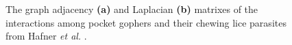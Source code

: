 
\begin{figure}
    \centering
    \caption{The graph adjacency \textbf{(a)} and Laplacian \textbf{(b)} matrixes of the interactions among pocket gophers and their chewing lice parasites from Hafner {\em et al.} \cite{hafner1994disparate}.}
    \label{fig:FP_ajlp}
\end{figure}